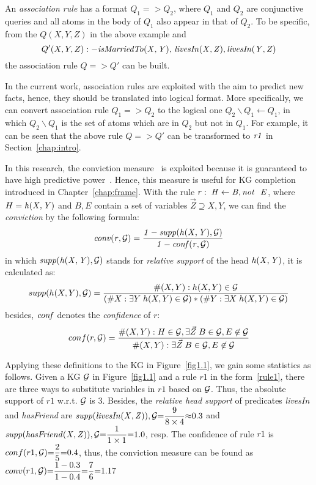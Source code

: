 An \emph{association rule} has a format $Q_1 => Q_2$, where $Q_1$ and $Q_2$ are conjunctive queries and all atoms in the body of $Q_1$ also appear in that of $Q_2$. To be specific, from the $Q(X,Y,Z)$ in the above example and
\begin{equation}Q'(X,Y,Z):-\mathit{isMarriedTo(X,Y),\,livesIn(X,Z),\,} \mathit{livesIn(Y,Z)}
\end{equation} the association rule $Q => Q'$ can be built.

In the current work, association rules are exploited with the aim to predict new facts, hence, they should be translated into logical format. More specifically, we can convert association rule $Q_1=>Q_2$ to the logical one $Q_2\backslash Q_1 \leftarrow Q_1$, in which $Q_2 \backslash Q_1$ is the set of atoms which are in $Q_2$ but not in $Q_1$. For example, it can be seen that the above rule $Q=>Q'$ can be transformed to $\mathit{r1}$ in Section~\ref{chap:intro}.

In this research, the conviction measure~\cite{ref48} is exploited because it is guaranteed to have high predictive power~\cite{ref46}. Hence, this measure is useful for KG completion introduced in Chapter~\ref{chap:frame}. With the rule $r:\;\mathit{H\leftarrow B, \mathit{not}~ \ E}$, where $H=\mathit{h(X,Y)}$ and $B,E$ contain a set of variables $\vec{Z}\supseteq X,Y$, we can find the \emph{conviction} by the following formula:
\vspace{-.26cm}
\begin{equation}
\mathit{conv(r, \mathcal{G})= \dfrac{1 - supp(h(X,Y), \mathcal{G})}{1 - conf(r, \mathcal{G})}}
\end{equation}
in which $\mathit{supp(h(X,Y),\mathcal{G})}$ stands for \textit{relative support} of the head $\mathit{h(X,Y)}$, it is calculated as:
\vspace{-.28cm}
\begin{equation}
supp(h(X,Y),\mathcal{G})=\dfrac{\#(X,Y):h(X,Y)\in \mathcal{G}}{(\#X:\exists Y\;h(X,Y)\in \mathcal{G})*(\#Y:\exists X\;h(X,Y)\in \mathcal{G})}
\end{equation}
besides, $\mathit{conf}$ denotes the \textit{confidence} of $r$:
\begin{equation}
conf(r,\mathcal{G})=\dfrac{\#(X,Y): H \in \mathcal{G}, \exists \vec{Z}\;B\in \mathcal{G},E \not \in \mathcal{G}}{\#(X,Y):\exists \vec{Z}\; B\in \mathcal{G}, E \not \in \mathcal{G}}
\end{equation}
\vspace{-.3cm}

\begin{example}
Applying these definitions to the KG in Figure~\ref{fig1.1}, we gain some statistics as follows. Given a KG $\mathcal{G}$ in Figure~\ref{fig1.1} and a rule $r1$ in the form~\ref{rule1}, there are three ways to substitute variables in $r1$ based on $\mathcal{G}$. Thus, the absolute support of $r1$ w.r.t. $\mathcal{G}$ is $3$. Besides, the \textit{relative head support} of predicates \textit{livesIn} and \textit{hasFriend} are $\mathit{supp(livesIn(X,Z)), \mathcal{G}}{=}\dfrac{9}{8 \times 4}{\approx} 0.3$ and  $\mathit{supp(hasFriend(X,Z)), \mathcal{G}}{=}\dfrac{1}{1 \times 1}{=} 1.0$, resp. The confidence of rule $r1$ is $conf(r1, \mathcal{G}) {=} \dfrac{2}{5} {=} 0.4$, thus, the conviction measure can be found as $conv(r1, \mathcal{G}) {=} \dfrac{1-0.3}{1 - 0.4} {=} \dfrac{7}{6} {=} 1.17$
\end{example}